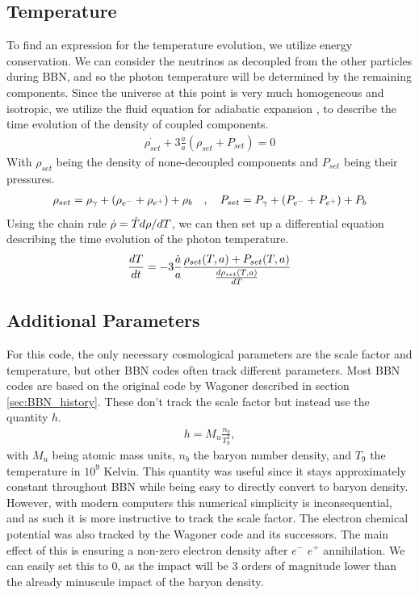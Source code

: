 \subsection{Temperature}
To find an expression for the temperature evolution, we utilize energy conservation. We can consider the neutrinos as decoupled from the other particles during BBN, and so the photon temperature will be determined by the remaining components. Since the universe at this point is very much homogeneous and isotropic, we utilize the fluid equation for adiabatic expansion \cite[{(4.44)}]{Ryden}, to describe the time evolution of the density of coupled components.
\begin{align}
    \dot{\rho_{set}}+3\frac{\dot{a}}{a}(\rho_{set} + P_{set})=0
\end{align}
With $\rho_{set}$ being the density of none-decoupled components and $P_{set}$ being their pressures.
\begin{align}
    \rho_{set}=\rho_{\gamma}+(\rho_{e^-}+\rho_{e^+})+\rho_{b}
    \quad , \quad P_{set}=P_{\gamma}+(P_{e^-}+P_{e^+})+P_{b}
\end{align}
Using the chain rule $\dot{\rho}=\dot{T}d\rho/dT$, we can then set up a differential equation describing the time evolution of the photon temperature. 
\begin{align}
    \frac{dT}{dt}=-3\frac{\dot{a}}{a}\frac{\rho_{set}(T,a) + P_{set}(T,a)}{\frac{d\rho_{set}(T,a)}{dT}}
    \label{eq:dTdt}
\end{align}

\subsection{Additional Parameters}
For this code, the only necessary cosmological parameters are the scale factor and temperature, but other BBN codes often track different parameters. Most BBN codes are based on the original code by Wagoner described in section \ref{sec:BBN_history}. These don't track the scale factor but instead use the quantity $h$.
\begin{align}
    h=M_u\frac{n_{b}}{T^3_9},
\end{align}
with $M_u$ being atomic mass units, $n_b$ the baryon number density, and  $T_9$ the temperature in $10^9$ Kelvin. This quantity was useful since it stays approximately constant throughout BBN while being easy to directly convert to baryon density. However, with modern computers this numerical simplicity is inconsequential, and as such it is more instructive to track the scale factor.
The electron chemical potential was also tracked by the Wagoner code and its successors. The main effect of this is ensuring a non-zero electron density after $e^-$ $e^+$ annihilation. We can easily set this to 0, as the impact will be 3 orders of magnitude lower than the already minuscule impact of the baryon density.

